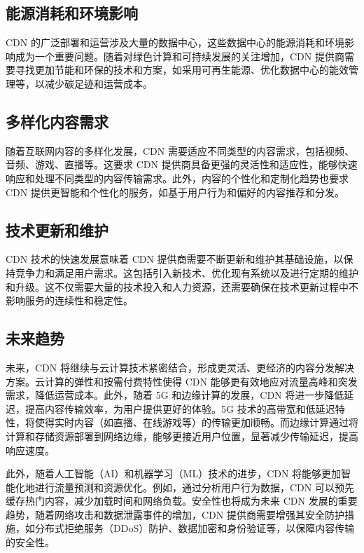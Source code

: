 \subsection{能源消耗和环境影响}

CDN 的广泛部署和运营涉及大量的数据中心，这些数据中心的能源消耗和环境影响成为一个重要问题。随着对绿色计算和可持续发展的关注增加，CDN 提供商需要寻找更加节能和环保的技术和方案，如采用可再生能源、优化数据中心的能效管理等，以减少碳足迹和运营成本。

\subsection{多样化内容需求}

随着互联网内容的多样化发展，CDN 需要适应不同类型的内容需求，包括视频、音频、游戏、直播等。这要求 CDN 提供商具备更强的灵活性和适应性，能够快速响应和处理不同类型的内容传输需求。此外，内容的个性化和定制化趋势也要求 CDN 提供更智能和个性化的服务，如基于用户行为和偏好的内容推荐和分发。

\subsection{技术更新和维护}

CDN 技术的快速发展意味着 CDN 提供商需要不断更新和维护其基础设施，以保持竞争力和满足用户需求。这包括引入新技术、优化现有系统以及进行定期的维护和升级。这不仅需要大量的技术投入和人力资源，还需要确保在技术更新过程中不影响服务的连续性和稳定性。

\subsection{未来趋势}

未来，CDN 将继续与云计算技术紧密结合，形成更灵活、更经济的内容分发解决方案。云计算的弹性和按需付费特性使得 CDN 能够更有效地应对流量高峰和突发需求，降低运营成本。此外，随着 5G 和边缘计算的发展，CDN 将进一步降低延迟，提高内容传输效率，为用户提供更好的体验。5G 技术的高带宽和低延迟特性，将使得实时内容（如直播、在线游戏等）的传输更加顺畅。而边缘计算通过将计算和存储资源部署到网络边缘，能够更接近用户位置，显著减少传输延迟，提高响应速度。

此外，随着人工智能（AI）和机器学习（ML）技术的进步，CDN 将能够更加智能化地进行流量预测和资源优化。例如，通过分析用户行为数据，CDN 可以预先缓存热门内容，减少加载时间和网络负载。安全性也将成为未来 CDN 发展的重要趋势，随着网络攻击和数据泄露事件的增加，CDN 提供商需要增强其安全防护措施，如分布式拒绝服务（DDoS）防护、数据加密和身份验证等，以保障内容传输的安全性。